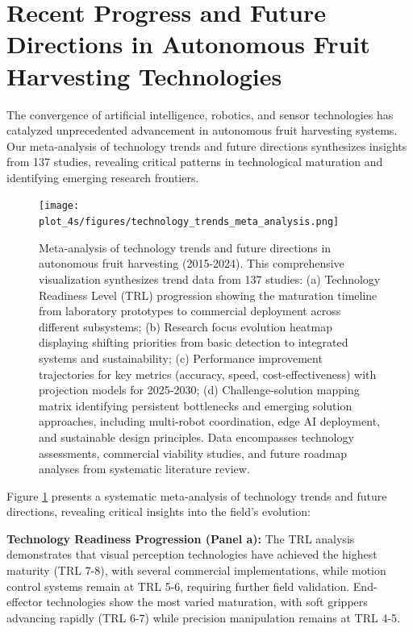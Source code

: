 \documentclass[a4paper,fleqn]{cas-dc}
\begin{document}
\section{Recent Progress and Future Directions in Autonomous Fruit Harvesting Technologies}

The convergence of artificial intelligence, robotics, and sensor technologies has catalyzed unprecedented advancement in autonomous fruit harvesting systems. Our meta-analysis of technology trends and future directions synthesizes insights from 137 studies, revealing critical patterns in technological maturation and identifying emerging research frontiers.

\begin{figure}[htbp]
\centering
\texttt{[image: plot\_4s/figures/technology\_trends\_meta\_analysis.png]}
\caption{Meta-analysis of technology trends and future directions in autonomous fruit harvesting (2015-2024). This comprehensive visualization synthesizes trend data from 137 studies: (a) Technology Readiness Level (TRL) progression showing the maturation timeline from laboratory prototypes to commercial deployment across different subsystems; (b) Research focus evolution heatmap displaying shifting priorities from basic detection to integrated systems and sustainability; (c) Performance improvement trajectories for key metrics (accuracy, speed, cost-effectiveness) with projection models for 2025-2030; (d) Challenge-solution mapping matrix identifying persistent bottlenecks and emerging solution approaches, including multi-robot coordination, edge AI deployment, and sustainable design principles. Data encompasses technology assessments, commercial viability studies, and future roadmap analyses from systematic literature review.}
\label{fig:technology_trends_meta}
\end{figure}

Figure \ref{fig:technology_trends_meta} presents a systematic meta-analysis of technology trends and future directions, revealing critical insights into the field's evolution:

\textbf{Technology Readiness Progression (Panel a):} The TRL analysis demonstrates that visual perception technologies have achieved the highest maturity (TRL 7-8), with several commercial implementations, while motion control systems remain at TRL 5-6, requiring further field validation. End-effector technologies show the most varied maturation, with soft grippers advancing rapidly (TRL 6-7) while precision manipulation remains at TRL 4-5.
\end{document}
